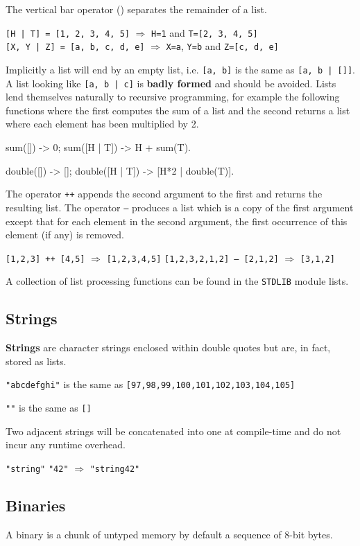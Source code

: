The vertical bar operator (\textbar{}) separates the remainder of a
list.

\texttt{[H | T]  = [1, 2, 3, 4, 5]} $\Rightarrow$ \texttt{H=1} and \texttt{T=[2, 3, 4, 5]} \\
\texttt{[X, Y | Z] = [a, b, c, d, e]} $\Rightarrow$ \texttt{X=a}, \texttt{Y=b} and \texttt{Z=[c, d, e]}

Implicitly a list will end by an empty list, i.e. \texttt{[a, b]} is
the same as \texttt{[a, b | []]}. A list looking like \texttt{[a, b |
c]} is \textbf{badly formed} and should be avoided. Lists lend
themselves naturally to recursive programming, for example the
following functions where the first computes the sum of a list and the
second returns a list where each element has been multiplied by 2.

\begin{erlang}
sum([]) -> 0;
sum([H | T]) -> H + sum(T).

double([]) -> [];
double([H | T]) -> [H*2 | double(T)].
\end{erlang}

The operator \texttt{++} appends the second argument to the first and
returns the resulting list. The operator \texttt{--} produces a list
which is a copy of the first argument except that for each element in
the second argument, the first occurrence of this element (if any) is
removed.

\texttt{[1,2,3] ++ [4,5]} $\Rightarrow$ \texttt{[1,2,3,4,5]}
\texttt{[1,2,3,2,1,2] -- [2,1,2]} $\Rightarrow$ \texttt{[3,1,2]}

A collection of list processing functions can be found in the
\texttt{STDLIB} module lists.


\subsection{Strings}
\label{datatypes:string}
\textbf{Strings} are character strings enclosed within double quotes
but are, in fact, stored as lists.

\texttt{"abcdefghi"} is the same as \texttt{[97,98,99,100,101,102,103,104,105]}

\texttt{""} is the same as \texttt{[]}

Two adjacent strings will be concatenated into one at compile-time and
do not incur any runtime overhead.

\texttt{"string"} \texttt{"42"} $\Rightarrow$ \texttt{"string42"}


\subsection{Binaries}
\label{datatypes:binary}
A binary is a chunk of untyped memory by default a sequence of 8-bit
bytes.


